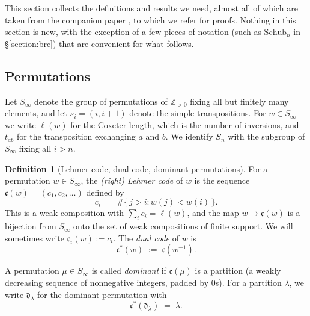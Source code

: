 \documentclass{amsart}
\theoremstyle{definition}
\newtheorem{definition}[lemma]{Definition}
\theoremstyle{remark}
\numberwithin{equation}{subsection}
\newcommand{\dom}{\mathfrak{d}}
\newcommand{\code}{\mathfrak{c}}
\begin{document}
This section collects the definitions and results we need, almost all of which are taken from the companion paper \cite{samuelbialgebra}, to which we refer for proofs. Nothing in this section is new, with the exception of a few pieces of notation (such as $\mathrm{Schub}_n$ in \S\ref{section:brc}) that are convenient for what follows.

\subsection{Permutations}\label{section:perms}

Let $S_\infty$ denote the group of permutations of $\mathbb{Z}_{>0}$ fixing all but finitely many elements, and let $s_i=(i,i+1)$ denote the simple transpositions. For $w\in S_\infty$ we write $\ell(w)$ for the Coxeter length, which is the number of inversions, and $t_{ab}$ for the transposition exchanging $a$ and $b$. We identify $S_n$ with the subgroup of $S_\infty$ fixing all $i>n$.

\begin{definition}[Lehmer code, dual code, dominant permutations]\label{definition:codestuff}
For a permutation $w\in S_\infty$, the \emph{(right) Lehmer code} of $w$ is the sequence $\code(w)=(c_1,c_2,\ldots)$ defined by
$$c_i \;=\; \#\{\,j>i : w(j)<w(i)\,\}.$$
This is a weak composition with $\sum_i c_i=\ell(w)$, and the map $w\mapsto\code(w)$ is a bijection from $S_\infty$ onto the set of weak compositions of finite support. We will sometimes write $\code_i(w):=c_i$. The \emph{dual code} of $w$ is
$$\code^*(w) \;:=\; \code(w^{-1}).$$

A permutation $\mu\in S_\infty$ is called \emph{dominant} if $\code(\mu)$ is a partition (a weakly decreasing sequence of nonnegative integers, padded by $0$s). For a partition $\lambda$, we write $\dom_\lambda$ for the dominant permutation with
$$\code^*(\dom_\lambda) \;=\; \lambda.$$
\end{definition}
\end{document}
